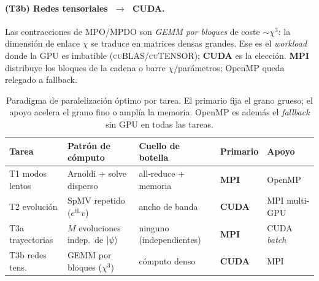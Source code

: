 \documentclass[11pt,a4paper]{article}
\theoremstyle{definition}
\theoremstyle{plain}
\begin{document}
\paragraph{(T3b) Redes tensoriales $\;\to\;$ CUDA.}
Las contracciones de MPO/MPDO son \emph{GEMM por bloques} de coste ${\sim}\chi^3$:
la dimensión de enlace $\chi$ se traduce en matrices densas grandes. Ese es el
\emph{workload} donde la GPU es imbatible (\textsc{cuBLAS}/\textsc{cuTENSOR});
\textbf{CUDA} es la elección. \textbf{MPI} distribuye los bloques de la cadena o
barre $\chi$/parámetros; OpenMP queda relegado a fallback.

\begin{table}[h]
\centering
\small
\begin{tabular}{@{}lllll@{}}
\toprule
Tarea & Patrón de cómputo & Cuello de botella & Primario & Apoyo \\
\midrule
T1 modos lentos & Arnoldi ${+}$ solve disperso & all-reduce ${+}$ memoria & \textbf{MPI} & OpenMP \\
T2 evolución    & SpMV repetido ($e^{t\mathbb L}v$) & ancho de banda & \textbf{CUDA} & MPI multi-GPU \\
T3a trayectorias& $M$ evoluciones indep.\ de $\ket\psi$ & ninguno (independientes) & \textbf{MPI} & CUDA \emph{batch} \\
T3b redes tens. & GEMM por bloques ($\chi^3$) & cómputo denso & \textbf{CUDA} & MPI \\
\bottomrule
\end{tabular}
\caption{Paradigma de paralelización óptimo por tarea. El primario fija el grano
grueso; el apoyo acelera el grano fino o amplía la memoria. OpenMP es además el
\emph{fallback} sin GPU en todas las tareas.}
\label{tab:paradigma}
\end{table}
\end{document}

